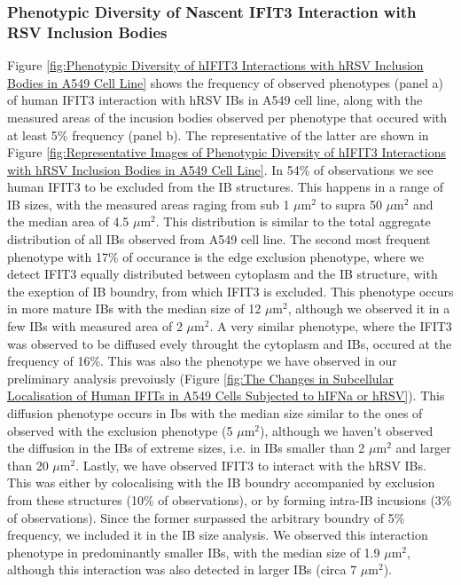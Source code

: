 \subsubsection{Phenotypic Diversity of Nascent IFIT3 Interaction with RSV Inclusion Bodies}
Figure \ref{fig:Phenotypic Diversity of hIFIT3 Interactions with hRSV Inclusion Bodies in A549 Cell Line} shows the frequency of observed phenotypes (panel a) of human IFIT3 interaction with hRSV IBs in A549 cell line, along with the measured areas of the incusion bodies observed per phenotype that occured with at least 5\% frequency (panel b). The representative of the latter are shown in Figure \ref{fig:Representative Images of Phenotypic Diversity of hIFIT3 Interactions with hRSV Inclusion Bodies in A549 Cell Line}. In 54\% of observations we see human IFIT3 to be excluded from the IB structures. This happens in a range of IB sizes, with the measured areas raging from sub 1 \(\mu \mbox{m}^2\) to supra 50 \(\mu \mbox{m}^2\) and the median area of 4.5 \(\mu \mbox{m}^2\). This distribution is similar to the total aggregate distribution of all IBs observed from A549 cell line. The second most frequent phenotype with 17\% of occurance is the edge exclusion phenotype, where we detect IFIT3 equally distributed between cytoplasm and the IB structure, with the exeption of IB boundry, from which IFIT3 is excluded. This phenotype occurs in more mature IBs with the median size of 12 \(\mu \mbox{m}^2\), although we observed it in a few IBs with measured area of 2 \(\mu \mbox{m}^2\). A very similar phenotype, where the IFIT3 was observed to be diffused evely throught the cytoplasm and IBs, occured at the frequency of 16\%. This was also the phenotype we have observed in our preliminary analysis prevoiusly (Figure \ref{fig:The Changes in Subcellular Localisation of Human IFITs in A549 Cells Subjected to hIFNa or hRSV}). This diffusion phenotype occurs in Ibs with the median size similar to the ones of observed with the exclusion phenotype (5 \(\mu \mbox{m}^2\)), although we haven't observed the diffusion in the IBs of extreme sizes, i.e. in IBs smaller than 2 \(\mu \mbox{m}^2\) and larger than 20 \(\mu \mbox{m}^2\). Lastly, we have observed IFIT3 to interact with the hRSV IBs. This was either by colocalising with the IB boundry accompanied by exclusion from these structures (10\% of observations), or by forming intra-IB incusions (3\% of observations). Since the former surpassed the arbitrary boundry of 5\% frequency, we included it in the IB size analysis. We observed this interaction phenotype in predominantly smaller IBs, with the median size of 1.9 \(\mu \mbox{m}^2\), although this interaction was also detected in larger IBs (circa 7 \(\mu \mbox{m}^2\)).


